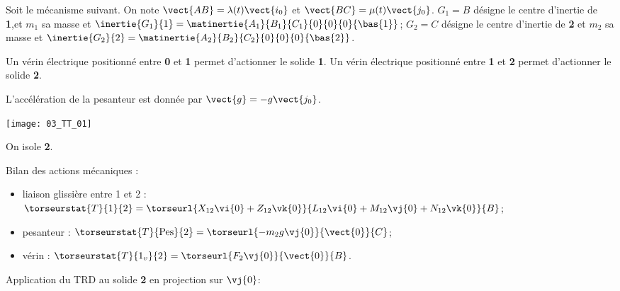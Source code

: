 \normaltrue
\correctiontrue



\setcounter{question}{0}
\ifcorrection
\else
{}
\fi

\ifprof
\else
Soit le mécanisme suivant. On note $\vect{AB}=\lambda(t)\vect{i_0}$ et $\vect{BC}=\mu(t)\vect{j_0}$.
$G_1 = B$ désigne le centre d'inertie de \textbf{1},et $m_1$ sa masse et $\inertie{G_1}{1}=\matinertie{A_1}{B_1}{C_1}{0}{0}{0}{\bas{1}}$; 
$G_2 = C$ désigne le centre d'inertie de \textbf{2} et  $m_2$ sa masse  et $\inertie{G_2}{2}=\matinertie{A_2}{B_2}{C_2}{0}{0}{0}{\bas{2}}$.

 Un vérin électrique positionné entre \textbf{0} et \textbf{1} permet d'actionner le solide \textbf{1}.
 Un vérin électrique positionné entre \textbf{1} et \textbf{2} permet d'actionner le solide \textbf{2}.

L'accélération de la pesanteur est donnée par $\vect{g}=-g\vect{j_0}$.

\begin{center}
\texttt{[image: 03\_TT\_01]}
\end{center}
\fi

\ifprof

On isole \textbf{2}. 

\vspace{.25cm}

Bilan des actions mécaniques : 
\begin{itemize}
\item liaison glissière entre 1 et 2 : 
$\torseurstat{T}{1}{2}= \torseurl{X_{12}\vi{0}+Z_{12}\vk{0}}{L_{12}\vi{0}+M_{12}\vj{0}+N_{12}\vk{0}}{B}$;
\item pesanteur : $\torseurstat{T}{\text{Pes}}{2}= \torseurl{-m_2 g \vj{0}}{\vect{0}}{C}$;
\item vérin : $\torseurstat{T}{1_v}{2}= \torseurl{F_2 \vj{0}}{\vect{0}}{B}$.
\end{itemize}

\vspace{.25cm}

Application du TRD au solide \textbf{2} en projection sur $\vj{0}$: 

